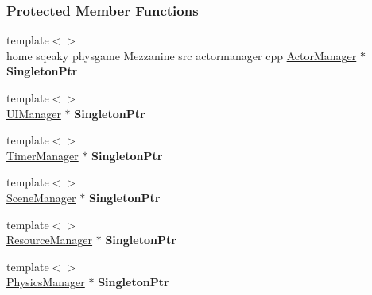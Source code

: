 \subsubsection*{Protected Member Functions}
\begin{DoxyCompactItemize}
\item 
\hypertarget{classMezzanine_1_1Singleton_ac0fba05e9d54e5ff509b7c1715d5f2f6}{
{\footnotesize template$<$$>$ }\\home sqeaky physgame Mezzanine src actormanager cpp \hyperlink{classMezzanine_1_1ActorManager}{ActorManager} $\ast$ {\bfseries SingletonPtr}}
\label{classMezzanine_1_1Singleton_ac0fba05e9d54e5ff509b7c1715d5f2f6}

\item 
\hypertarget{classMezzanine_1_1Singleton_a3e2d258d97c4686df2a0025987148824}{
{\footnotesize template$<$$>$ }\\\hyperlink{classMezzanine_1_1UIManager}{UIManager} $\ast$ {\bfseries SingletonPtr}}
\label{classMezzanine_1_1Singleton_a3e2d258d97c4686df2a0025987148824}

\item 
\hypertarget{classMezzanine_1_1Singleton_a418516c1ec4ebe5a76f1c0a7a65b5b13}{
{\footnotesize template$<$$>$ }\\\hyperlink{classMezzanine_1_1TimerManager}{TimerManager} $\ast$ {\bfseries SingletonPtr}}
\label{classMezzanine_1_1Singleton_a418516c1ec4ebe5a76f1c0a7a65b5b13}

\item 
\hypertarget{classMezzanine_1_1Singleton_a11e9a146c4058601d4a9fe8d83fd61a2}{
{\footnotesize template$<$$>$ }\\\hyperlink{classMezzanine_1_1SceneManager}{SceneManager} $\ast$ {\bfseries SingletonPtr}}
\label{classMezzanine_1_1Singleton_a11e9a146c4058601d4a9fe8d83fd61a2}

\item 
\hypertarget{classMezzanine_1_1Singleton_a137ae0a32a54dd2683caa05b772b9c52}{
{\footnotesize template$<$$>$ }\\\hyperlink{classMezzanine_1_1ResourceManager}{ResourceManager} $\ast$ {\bfseries SingletonPtr}}
\label{classMezzanine_1_1Singleton_a137ae0a32a54dd2683caa05b772b9c52}

\item 
\hypertarget{classMezzanine_1_1Singleton_ac923e5b8546f94e614608c60b3187a77}{
{\footnotesize template$<$$>$ }\\\hyperlink{classMezzanine_1_1PhysicsManager}{PhysicsManager} $\ast$ {\bfseries SingletonPtr}}
\label{classMezzanine_1_1Singleton_ac923e5b8546f94e614608c60b3187a77}


\end{DoxyCompactItemize}
